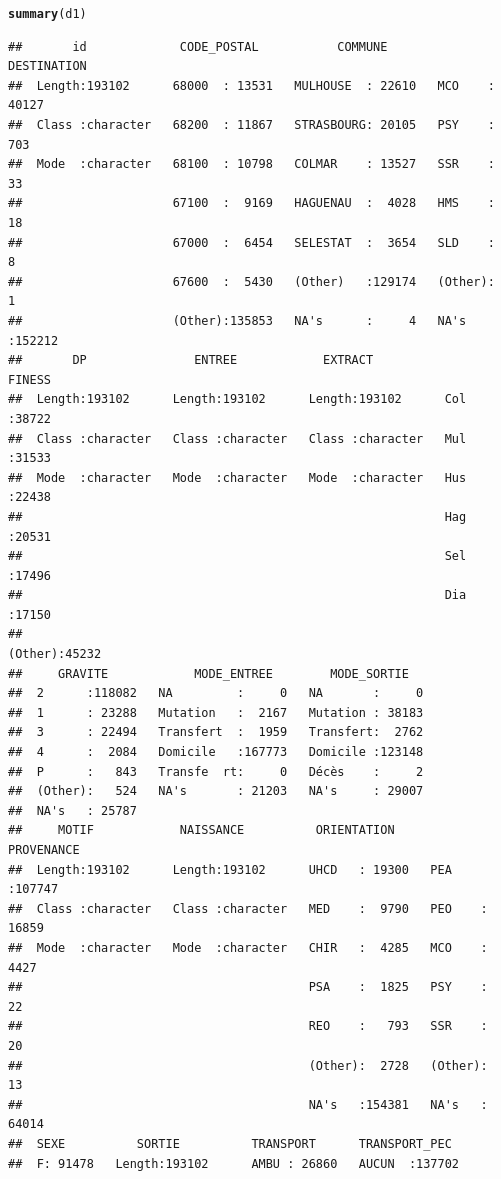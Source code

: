 \documentclass[12pt,english,french,twoside]{report}\usepackage[]{graphicx}\usepackage[]{color}
\makeatletter
\newcommand{\hlkwd}[1]{\textcolor[rgb]{0.737,0.353,0.396}{\textbf{#1}}}%
\newenvironment{kframe}{%
 \def\at@end@of@kframe{}%
 \ifinner\ifhmode%
  \def\at@end@of@kframe{\end{minipage}}%
  \begin{minipage}{\columnwidth}%
 \fi\fi%
 \def\FrameCommand##1{\hskip\@totalleftmargin \hskip-\fboxsep
 \colorbox{shadecolor}{##1}\hskip-\fboxsep
     \hskip-\linewidth \hskip-\@totalleftmargin \hskip\columnwidth}%
 \MakeFramed {\advance\hsize-\width
   \@totalleftmargin\z@ \linewidth\hsize
   \@setminipage}}%
 {\par\unskip\endMakeFramed%
 \at@end@of@kframe}
\newenvironment{knitrout}{}{} %
\makeatother
\begin{document}
\begin{knitrout}
\begin{kframe}
\begin{alltt}
\hlkwd{summary}(d1)
\end{alltt}
\begin{verbatim}
##       id             CODE_POSTAL           COMMUNE        DESTINATION    
##  Length:193102      68000  : 13531   MULHOUSE  : 22610   MCO    : 40127  
##  Class :character   68200  : 11867   STRASBOURG: 20105   PSY    :   703  
##  Mode  :character   68100  : 10798   COLMAR    : 13527   SSR    :    33  
##                     67100  :  9169   HAGUENAU  :  4028   HMS    :    18  
##                     67000  :  6454   SELESTAT  :  3654   SLD    :     8  
##                     67600  :  5430   (Other)   :129174   (Other):     1  
##                     (Other):135853   NA's      :     4   NA's   :152212  
##       DP               ENTREE            EXTRACT              FINESS     
##  Length:193102      Length:193102      Length:193102      Col    :38722  
##  Class :character   Class :character   Class :character   Mul    :31533  
##  Mode  :character   Mode  :character   Mode  :character   Hus    :22438  
##                                                           Hag    :20531  
##                                                           Sel    :17496  
##                                                           Dia    :17150  
##                                                           (Other):45232  
##     GRAVITE            MODE_ENTREE        MODE_SORTIE    
##  2      :118082   NA         :     0   NA       :     0  
##  1      : 23288   Mutation   :  2167   Mutation : 38183  
##  3      : 22494   Transfert  :  1959   Transfert:  2762  
##  4      :  2084   Domicile   :167773   Domicile :123148  
##  P      :   843   Transfe  rt:     0   Décès    :     2  
##  (Other):   524   NA's       : 21203   NA's     : 29007  
##  NA's   : 25787                                          
##     MOTIF            NAISSANCE          ORIENTATION       PROVENANCE    
##  Length:193102      Length:193102      UHCD   : 19300   PEA    :107747  
##  Class :character   Class :character   MED    :  9790   PEO    : 16859  
##  Mode  :character   Mode  :character   CHIR   :  4285   MCO    :  4427  
##                                        PSA    :  1825   PSY    :    22  
##                                        REO    :   793   SSR    :    20  
##                                        (Other):  2728   (Other):    13  
##                                        NA's   :154381   NA's   : 64014  
##  SEXE          SORTIE          TRANSPORT      TRANSPORT_PEC   
##  F: 91478   Length:193102      AMBU : 26860   AUCUN  :137702  

\end{verbatim}
\end{kframe}
\end{knitrout}
\end{document}
